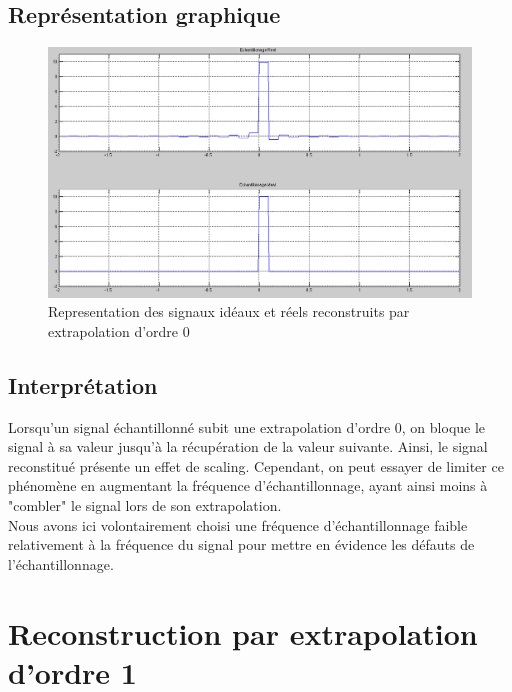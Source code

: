\documentclass[a4paper, oneside]{report}
\begin{document}
	\newpage{}
	\subsection{Repr\'esentation graphique}
	
	\begin{figure}[h]
   \centering
    \includegraphics[scale=0.43]{images/Exo4_0.png}
    \caption{Representation des signaux id\'eaux et r\'eels reconstruits par extrapolation d'ordre 0}
  \end{figure}
  
	\subsection{Interpr\'etation}
	
Lorsqu'un signal \'echantillonn\'e subit une extrapolation d'ordre 0, on bloque le signal \`a sa valeur jusqu'\`a la r\'ecup\'eration de la valeur suivante. Ainsi, le signal reconstitu\'e pr\'esente un effet de scaling. Cependant, on peut essayer de limiter ce phénomène en augmentant la fréquence d'échantillonnage, ayant ainsi moins \`a "combler" le signal lors de son extrapolation.\\
Nous avons ici volontairement choisi une fr\'equence d'\'echantillonnage faible relativement \`a la fr\'equence du signal pour mettre en \'evidence les d\'efauts de l'\'echantillonnage.

\newpage{}
\section{Reconstruction par extrapolation d'ordre 1}
\end{document}
